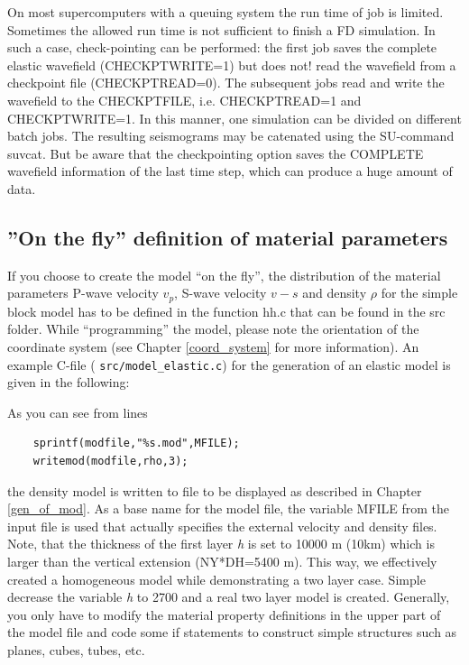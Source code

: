 \documentclass{hitec}
\begin{document}
On most supercomputers with a queuing system the run time of job is limited. Sometimes the allowed run time is not sufficient to finish a FD simulation. In such a case, check-pointing can be performed: the first job saves the complete elastic wavefield (CHECKPTWRITE=1) but does not! read the wavefield from a checkpoint file (CHECKPTREAD=0). The subsequent jobs read and write the wavefield to the CHECKPTFILE, i.e. CHECKPTREAD=1 and CHECKPTWRITE=1. In this manner, one simulation can be divided on different batch jobs. The resulting seismograms may be catenated using the SU-command suvcat. But be aware that the checkpointing option saves the COMPLETE wavefield information of the last time step, which can produce a huge amount of data.

\subsection{''On the fly'' definition of material parameters}
\label{model_def_func}
If you choose to create the model ``on the fly'', the distribution of the
material parameters P-wave velocity $v_p$, S-wave velocity $v-s$ and density
$\rho$ for the simple block model has to be defined in the function hh.c that
can be found in the src folder. While ``programming'' the model, please note
the orientation of the coordinate system (see Chapter \ref{coord_system} for
more information). An example C-file ( \lstinline{src/model_elastic.c}) for the
generation of an elastic model is given in the following:


As you can see from lines
\begin{verbatim}
    sprintf(modfile,"%s.mod",MFILE);
    writemod(modfile,rho,3);
\end{verbatim}
the density model is written to file to be displayed as described in Chapter \ref{gen_of_mod}. As a base name for the model file, the variable MFILE from the input file is used that actually specifies the external velocity and density files. Note, that the thickness of the first layer \textit{h} is set to 10000 m (10km) which is larger than the vertical extension (NY*DH=5400 m). This way, we effectively created a homogeneous model while demonstrating a two layer case. Simple decrease the variable \textit{h} to 2700 and a real two layer model is created. Generally, you only have to modify the material property definitions in the upper part of the model file and code some if statements to construct simple structures such as planes, cubes, tubes, etc.
\end{document}
